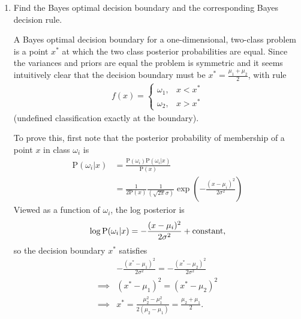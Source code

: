 \documentclass{article}
\newcommand{\p}{\text{P}}
\begin{document}
\begin{enumerate}[label=(\alph*)]

\item Find the Bayes optimal decision boundary and the corresponding Bayes decision rule.
    \begin{mdframed}
      A Bayes optimal decision boundary for a one-dimensional, two-class
      problem is a point $x^*$ at which the two class posterior probabilities
      are equal. Since the variances and priors are equal the problem is
      symmetric and it seems intuitively clear that the decision boundary must
      be $x^* = \frac{\mu_1 + \mu_2}{2}$, with rule
      \begin{align*}
        f(x) =
        \begin{cases}
          \omega_1, &x < x^* \\
          \omega_2, &x > x^*
        \end{cases}
      \end{align*}
      (undefined classification exactly at the boundary).

      To prove this, first note that the posterior probability of membership of
      a point $x$ in class $\omega_i$ is
      \begin{align*}
        \p(\omega_i|x)
        &= \frac{\p(\omega_i)\p(\omega_i|x)}{\p(x)} \\
        &= \frac{1}{2\p(x)} \frac{1}{(\sqrt{2\pi}\sigma)}\exp(-\frac{(x - \mu_i)^2}{2\sigma^2})
      \end{align*}
      Viewed as a function of $\omega_i$, the log posterior is
      \begin{align*}
        \log \p(\omega_i|x) = -\frac{(x - \mu_i)^2}{2\sigma^2} + \constant,
      \end{align*}
      so the decision boundary $x^*$ satisfies
      \begin{align*}
        &-\frac{(x^* - \mu_1)^2}{2\sigma^2} = -\frac{(x^* - \mu_2)^2}{2\sigma^2} \\
        \implies&(x^* - \mu_1)^2 = (x^* - \mu_2)^2 \\
        \implies&x^* = \frac{\mu_2^2 - \mu_1^2}{2(\mu_2 - \mu_1)} = \frac{\mu_2 + \mu_1}{2}. \\
      \end{align*}


\end{mdframed}
\end{enumerate}
\end{document}
